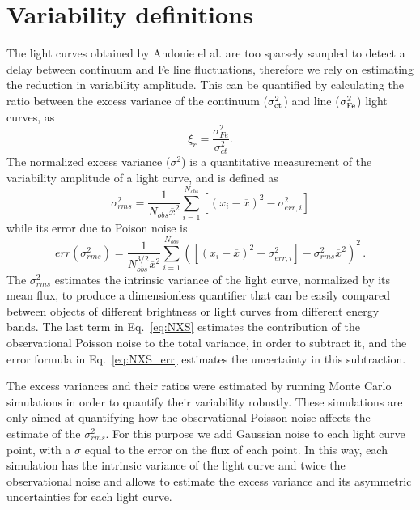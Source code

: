 \section{Variability definitions} \label{sec:variability_defs}
The light curves obtained by Andonie el al. are too sparsely sampled to detect a delay between continuum and Fe line fluctuations, therefore we rely on estimating the reduction in variability amplitude. This can be quantified by calculating the ratio between the excess variance of the continuum ($\sigma^2_{\rm ct}$) and \kalfa{} line ($\sigma^2_{\rm Fe}$) light curves, as %
\begin{equation}\label{eq:xi}
    \xi_{r}=\frac{\sigma^2_{Fe}}{\sigma^2_{ct}}.
\end{equation}
The normalized excess variance ($\sigma^2$) \citep[e.g.,][]{1997ApJ...476...70N,2004ApJ...611...93P,2008A&A...487..475P} is a quantitative measurement of the variability amplitude of a light curve, and is defined as
\begin{equation}
\label{eq:NXS}
    \sigma^2_{rms} = \frac{1}{N_{obs}\overline{x}^2} \sum^{N_{obs}}_{i=1} [(x_i-\overline{x})^2-\sigma^2_{err,i}]
\end{equation}
while its error due to Poison noise is
\begin{equation}
\label{eq:NXS_err}
 err( \sigma^2_{rms}) = \frac{1}{N_{obs}^{3/2}\overline{x}^2} \sum^{N_{obs}}_{i=1} ([(x_i-\overline{x})^2-\sigma^2_{err,i}]-\sigma^2_{rms} \overline{x}^2)^2\,.
\end{equation}
The $\sigma^2_{rms}$ estimates the intrinsic variance of the light curve, normalized by its mean flux, to produce a dimensionless quantifier that can be easily compared between objects of different brightness or light curves from  different energy bands. The last term in Eq.~\ref{eq:NXS} estimates the contribution of the observational Poisson noise to the total variance, in order to subtract it, and the error formula in Eq.~\ref{eq:NXS_err} estimates the uncertainty in this subtraction. 

The excess variances and their ratios were estimated by running Monte Carlo simulations in order to quantify their variability robustly. 
These simulations are only aimed at quantifying how the observational Poisson noise affects the estimate of the $\sigma^2_{rms}$. For this purpose we add Gaussian noise to each light curve point, with a $\sigma$ equal to the error on the flux of each point. In this way, each simulation has the intrinsic variance of the light curve and twice the observational noise and allows to estimate the excess variance and its asymmetric uncertainties for each light curve.

